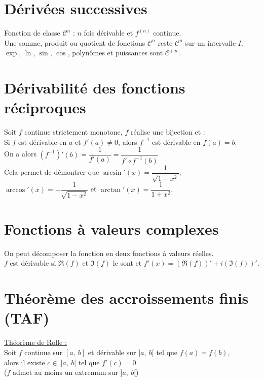 \section{Dérivées successives}\label{sec:deriv-es-successives}

    Fonction de classe $\mathcal{C}^n$ : $n$ fois dérivable et $f^{(n)}$ continue.\\
    Une somme, produit ou quotient de fonctions $\mathcal{C}^n$ reste $\mathcal{C}^n$ sur un intervalle $I$.\\
    $\exp$, $\ln$, $\sin$, $\cos$, polynômes et puissances sont $\mathcal{C}^{+\infty}$.


\section{Dérivabilité des fonctions réciproques}\label{sec:derivabilite-des-fonctions-reciproques}

    Soit $f$ continue strictement monotone, $f$ réalise une bijection et :\\

    Si $f$ est dérivable en $a$ et $f'(a) \neq 0$, alors $f^{-1}$ est dérivable en $f(a) = b$.\\

    On a alors $(f^{-1})'(b) = \dfrac{1}{f'(a)} = \dfrac{1}{f' \circ f^{-1}(b)}$\\

    Cela permet de démontrer que $\arcsin'(x) = \dfrac{1}{\sqrt{1 - x^2}}$, $\arccos'(x) = -\dfrac{1}{\sqrt{1 - x^2}}$ et $\arctan'(x) = \dfrac{1}{1 + x^2}$.


\section{Fonctions à valeurs complexes}\label{sec:fonctions-a-valeurs-complexes}

    On peut décomposer la fonction en deux fonctions à valeurs réelles.
    \vspace{3pt}\\
    $f$ est dérivable si $\Re(f)$ et $\Im(f)$ le sont et $f'(x) = (\Re(f))' + i (\Im(f))'$.


\section{Théorème des accroissements finis (TAF)}\label{sec:theoreme-des-accroissements-finis-(taf)}

    \underline{Théorème de Rolle :}\\
    Soit $f$ continue sur $[a,\ b]$ et dérivable sur $]a,\ b[$ tel que $f(a) = f(b)$,\\
    alors il existe $c \in\ ]a,\ b[$ tel que $f'(c) = 0$.\\
    ($f$ admet au moins un extremum sur $]a,\ b[$)\\

